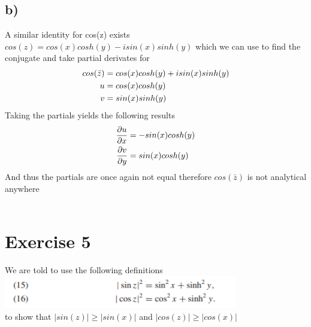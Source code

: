 \documentclass[notitlepage]{article}
\newcommand{\HwBreak}{%
  \par\noindent\makebox[\linewidth]{\rule{0.9\paperwidth}{0.4pt}}\par%
}
\begin{document}
    \subsection*{b)}
    A similar identity for cos(z) exists $cos(z) = cos(x)cosh(y)-isin(x)sinh(y)$ which we can use to find the conjugate and take partial derivates for
    \begin{equation}
    \begin{aligned}
        cos(\bar{z})    &=  cos(x)cosh(y) + isin(x)sinh(y) \notag \\
        u               &= cos(x)cosh(y) \\
        v               &= sin(x)sinh(y)
    \end{aligned}
\end{equation}
    Taking the partials yields the following results
\begin{equation}
    \begin{aligned}
        \frac{\partial u}{\partial x} &= -sin(x)cosh(y) \notag \\
        \frac{\partial v}{\partial y} &= sin(x)cosh(y)
    \end{aligned}
\end{equation}
    And thus the partials are once again not equal therefore $cos(\bar{z})$ is not analytical anywhere \\~\\
    
\HwBreak
\section*{Exercise 5}
    We are told to use the following definitions \\
\includegraphics[width=4in]{ex5_1} \\
    to show that $|sin(z)| \geq |sin(x)|$ and $|cos(z)| \geq |cos(x)|$
\end{document}
